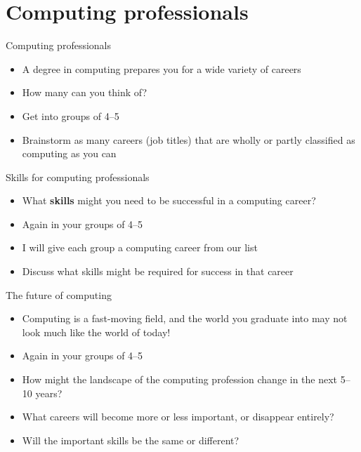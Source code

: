 \part{Computing professionals}
\frame{\partpage}

\begin{frame}{Computing professionals}
	\begin{itemize}
		\item A degree in computing prepares you for a wide variety of careers
		\item How many can you think of?
		\item Get into groups of 4--5
		\item Brainstorm as many careers (job titles) that are wholly or partly classified as computing
			as you can
	\end{itemize}
\end{frame}

\begin{frame}{Skills for computing professionals}
	\begin{itemize}
		\item What \textbf{skills} might you need to be successful in a computing career?
		\item Again in your groups of 4--5
		\item I will give each group a computing career from our list
		\item Discuss what skills might be required for success in that career
	\end{itemize}
\end{frame}

\begin{frame}{The future of computing}
	\begin{itemize}
		\item Computing is a fast-moving field, and the world you graduate into may not look much like the world of today!
		\item Again in your groups of 4--5
		\item How might the landscape of the computing profession change in the next 5--10 years?
		\item What careers will become more or less important, or disappear entirely?
		\item Will the important skills be the same or different?
	\end{itemize}
\end{frame}
